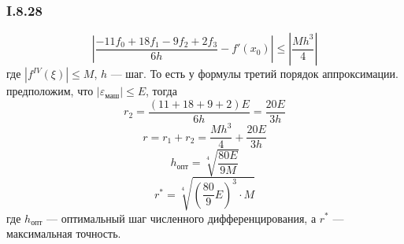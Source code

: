 \subsubsection*{I.8.28}
$$\left|\frac{-11f_0+18f_1-9f_2+2f_3}{6h} - f'(x_0)\right| \leq \left|\frac{Mh^3}{4}\right|$$
где $|f^{IV}(\xi)|\leq M$, $h$ --- шаг. То есть у формулы третий порядок аппроксимации.
предположим, что $|\varepsilon_{маш}| \leq E$, тогда 
$$r_2 = \frac{(11+18+9+2)E}{6h} = \frac{20E}{3h}$$
$$r = r_1 + r_2 = \frac{Mh^3}{4} + \frac{20E}{3h}$$
$$h_{опт}  = \sqrt[4]{\frac{80E}{9M}}$$
$$r^* = \sqrt[4]{\left(\frac{80}{9}E\right)^3 \cdot M}$$
где $h_{опт}$ --- оптимальный шаг численного дифференцирования, а $r^*$ --- максимальная точность.
